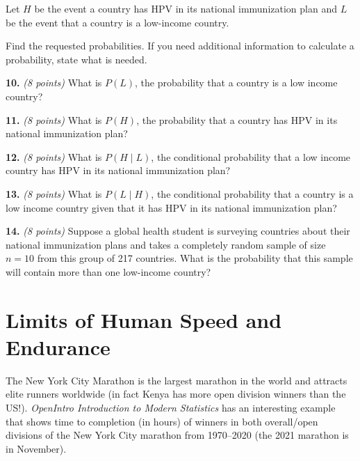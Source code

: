 \documentclass[
  11pt,
  letterpaper,
]{article}
\begin{document}
Let \(H\) be the event a country has HPV in its national immunization
plan and \(L\) be the event that a country is a low-income country.

Find the requested probabilities. If you need additional information to
calculate a probability, state what is needed.

\textbf{10.} \emph{(8 points)} What is \(P(L)\), the probability that a
country is a low income country?

\newpage

\textbf{11.} \emph{(8 points)} What is \(P(H)\), the probability that a
country has HPV in its national immunization plan?

\vspace{3.7in}

\textbf{12.} \emph{(8 points)} What is \(P(H\mid L)\), the conditional
probability that a low income country has HPV in its national
immunization plan?

\vspace{1.25in}

\newpage

\textbf{13.} \emph{(8 points)} What is \(P(L\mid H)\), the conditional
probability that a country is a low income country given that it has HPV
in its national immunization plan?

\vspace{5.9in}

\newpage

\textbf{14.} \emph{(8 points)} Suppose a global health student is
surveying countries about their national immunization plans and takes a
completely random sample of size \(n=10\) from this group of 217
countries. What is the probability that this sample will contain more
than one low-income country?

\vspace{5.9in}

\newpage

\section*{Limits of Human Speed and
Endurance}\label{limits-of-human-speed-and-endurance}

The New York City Marathon is the largest marathon in the world and
attracts elite runners worldwide (in fact Kenya has more open division
winners than the US!). \emph{OpenIntro Introduction to Modern
Statistics} has an interesting example that shows time to completion (in
hours) of winners in both overall/open divisions of the New York City
marathon from 1970--2020 (the 2021 marathon is in November).
\end{document}
